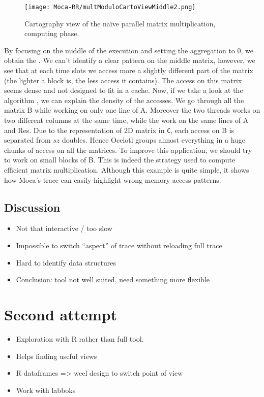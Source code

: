 \begin{figure}[htb]
    \centering
    \texttt{[image: Moca-RR/multModuloCartoViewMiddle2.png]}
    \caption{Cartography view of the naïve parallel matrix multiplication, computing phase.}
    \label{fig:ocelotl-Carto2}
\end{figure}

By focusing on the middle of the execution and setting the aggregation to $0$, we obtain the .
We can't identify a clear pattern on the middle matrix, however, we see that at each time slots we access more a slightly different part of the matrix (the lighter a block is, the less access it contains).
The access on this matrix seems  dense and not designed to fit in a cache.
Now, if we take a look at the algorithm , we can explain the density of the accesses.
We go through all the matrix B while working on only one line of A.
Moreover the two threads works on two different columns at the same time, while the work on the same lines of A and Res.
Due to the representation of 2D matrix in \texttt{C}, each access on B is separated from $sz$ doubles.
Hence \gls{Ocelotl} groups almost everything in a huge chunks of access on all the matrices.
To improve this application, we should try to work on small blocks of B.
This is indeed the strategy used to compute efficient matrix multiplication.
Although this example is quite simple, it shows how \gls{Moca}'s trace can easily highlight wrong memory access patterns.

\subsection{Discussion}

\begin{itemize}
    \item  Not that interactive / too slow
    \item  Impossible to switch “aspect” of trace without reloading full trace
    \item  Hard to identify data structures
    \item  Conclusion: tool not well suited, need something more flexible
\end{itemize}

\section{Second attempt}
\label{sec:visu-second}

\begin{itemize}
    \item Exploration with R rather than full tool.
    \item Helps finding useful views
    \item R dataframes => weel design to switch point of view
    \item Work with labboks 
\end{itemize}

